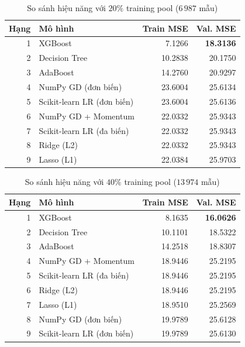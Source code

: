\begin{table}[H]
    \centering
    \caption{So sánh hiệu năng với $20\%$ training pool ($6\,987$ mẫu)}
    \label{tab:lc-20}
    \small
    \begin{tabular}{r p{} rr}
        \toprule
        \textbf{Hạng} & \textbf{Mô hình} & \textbf{Train MSE}
        & \textbf{Val. MSE} \\
        \midrule
        1 & XGBoost & 7.1266 & \textbf{18.3136} \\
        2 & Decision Tree & 10.2838 & 20.1750 \\
        3 & AdaBoost & 14.2760 & 20.9297 \\
        4 & NumPy GD (đơn biến) & 23.6004 & 25.6134 \\
        5 & Scikit-learn LR (đơn biến) & 23.6004 & 25.6136 \\
        6 & NumPy GD + Momentum & 22.0332 & 25.9343 \\
        7 & Scikit-learn LR (đa biến) & 22.0332 & 25.9343 \\
        8 & Ridge (L2) & 22.0332 & 25.9343 \\
        9 & Lasso (L1) & 22.0384 & 25.9703 \\
        \bottomrule
    \end{tabular}
\end{table}


\begin{table}[H]
    \centering
    \caption{So sánh hiệu năng với $40\%$ training pool ($13\,974$ mẫu)}
    \label{tab:lc-40}
    \small
    \begin{tabular}{r p{} rr}
        \toprule
        \textbf{Hạng} & \textbf{Mô hình} & \textbf{Train MSE}
        & \textbf{Val. MSE} \\
        \midrule
        1 & XGBoost & 8.1635 & \textbf{16.0626} \\
        2 & Decision Tree & 10.1101 & 18.5322 \\
        3 & AdaBoost & 14.2518 & 18.8307 \\
        4 & NumPy GD + Momentum & 18.9446 & 25.2195 \\
        5 & Scikit-learn LR (đa biến) & 18.9446 & 25.2195 \\
        6 & Ridge (L2) & 18.9446 & 25.2195 \\
        7 & Lasso (L1) & 18.9510 & 25.2569 \\
        8 & NumPy GD (đơn biến) & 19.9789 & 25.6128 \\
        9 & Scikit-learn LR (đơn biến) & 19.9789 & 25.6130 \\
        \bottomrule
    \end{tabular}
\end{table}

